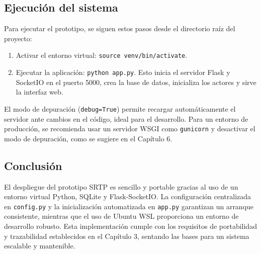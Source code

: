 \subsection{Ejecución del sistema}

Para ejecutar el prototipo, se siguen estos pasos desde el directorio raíz del proyecto:

\begin{enumerate}
    \item Activar el entorno virtual: \texttt{source venv/bin/activate}.
    \item Ejecutar la aplicación: \texttt{python app.py}. Esto inicia el servidor Flask y SocketIO en el puerto 5000, crea la base de datos, inicializa los actores y sirve la interfaz web.
\end{enumerate}

El modo de depuración (\texttt{debug=True}) permite recargar automáticamente el servidor ante cambios en el código, ideal para el desarrollo. Para un entorno de producción, se recomienda usar un servidor WSGI como \texttt{gunicorn} y desactivar el modo de depuración, como se sugiere en el Capítulo 6.

\subsection{Conclusión}

El despliegue del prototipo SRTP es sencillo y portable gracias al uso de un entorno virtual Python, SQLite y Flask-SocketIO. La configuración centralizada en \texttt{config.py} y la inicialización automatizada en \texttt{app.py} garantizan un arranque consistente, mientras que el uso de Ubuntu WSL proporciona un entorno de desarrollo robusto. Esta implementación cumple con los requisitos de portabilidad y trazabilidad establecidos en el Capítulo 3, sentando las bases para un sistema escalable y mantenible.
